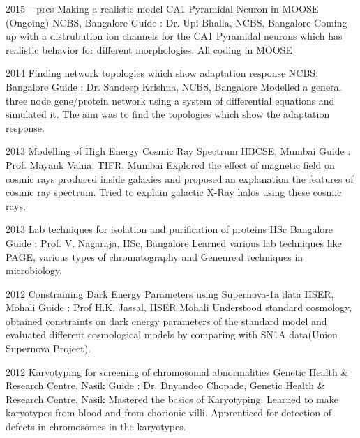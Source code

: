 \documentclass[11pt,print]{friggeri-cv}%
\begin{document}
\begin{entrylist}
  \entry
    {2015 -- pres}
    {Making a realistic model CA1 Pyramidal Neuron in MOOSE (Ongoing)}
    {NCBS, Bangalore}
    {Guide : Dr. Upi Bhalla, NCBS, Bangalore}
    {Coming up with a distrubution ion channels for the CA1 Pyramidal neurons which has realistic behavior for different morphologies. All coding in MOOSE}
\end{entrylist}
\begin{entrylist}
  \entry
    {2014}
    {Finding network topologies which show adaptation response}
    {NCBS, Bangalore}
    {Guide : Dr. Sandeep Krishna, NCBS, Bangalore}
    {Modelled a general three node gene/protein network using a system of differential equations and simulated it. The aim was to find the topologies which show the adaptation response.}
\end{entrylist}
\begin{entrylist}

  \entry
    {2013}
    {Modelling of High Energy Cosmic Ray Spectrum}
    {HBCSE, Mumbai}
    {Guide : Prof. Mayank Vahia, TIFR, Mumbai}
    {Explored the effect of magnetic field on cosmic rays produced inside galaxies and proposed an explanation the features of cosmic ray spectrum. Tried to explain galactic X-Ray halos using these cosmic rays.}
\end{entrylist}
\begin{entrylist}
    
  \entry
    {2013}
    {Lab techniques for isolation and purification of proteins}
    {IISc Bangalore}
    {
    Guide : Prof. V. Nagaraja, IISc, Bangalore}
    {Learned various lab techniques like PAGE, various types of chromatography and Genenreal techniques in microbiology.}    
\end{entrylist}
\begin{entrylist}

  \entry
    {2012}
    {Constraining Dark Energy Parameters using Supernova-1a data}
    {IISER, Mohali}
    {Guide : Prof H.K. Jassal, IISER Mohali}
    {Understood standard cosmology,  obtained constraints on dark energy parameters of the standard model and evaluated different cosmological models by comparing with SN1A data(Union Supernova Project).
    }
    
\end{entrylist}
\begin{entrylist}


  \entry
    {2012}
    {Karyotyping for screening of chromosomal abnormalities}
    {Genetic Health \& Research Centre, Nasik}
    {
    Guide : Dr. Dnyandeo Chopade, Genetic Health \& Research Centre, Nasik}
    {
    Mastered the basics of Karyotyping. Learned to make karyotypes from blood and from chorionic villi.  Apprenticed for  detection of defects in chromosomes in the karyotypes.
    }
    \end{entrylist}
\end{document}
